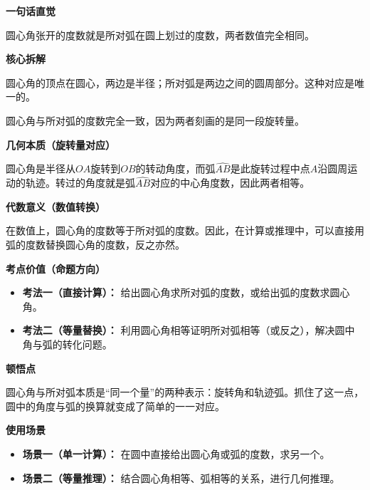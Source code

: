 \begin{explanationbox}
	\textbf{\textcolor{CExplanation}{一句话直觉}}

	圆心角张开的度数就是所对弧在圆上划过的度数，两者数值完全相同。

	\medskip
	\textbf{\textcolor{CExplanation}{核心拆解}}
	\begin{description}[style=nextline, leftmargin=2.8em, labelsep=0.5em, itemsep=0.45em]
		\item[\textbf{要点一（定义对应）：}] 圆心角的顶点在圆心，两边是半径；所对弧是两边之间的圆周部分。这种对应是唯一的。
		\item[\textbf{要点二（度数等同）：}] 圆心角与所对弧的度数完全一致，因为两者刻画的是同一段旋转量。
	\end{description}

	\medskip
	\textbf{\textcolor{CExplanation}{几何本质（旋转量对应）}}

	圆心角是半径从$OA$旋转到$OB$的转动角度，而弧$\widehat{AB}$是此旋转过程中点$A$沿圆周运动的轨迹。转过的角度就是弧$\widehat{AB}$对应的中心角度数，因此两者相等。

	\medskip
	\textbf{\textcolor{CExplanation}{代数意义（数值转换）}}

	在数值上，圆心角的度数等于所对弧的度数。因此，在计算或推理中，可以直接用弧的度数替换圆心角的度数，反之亦然。

	\medskip
	\textbf{\textcolor{CExplanation}{考点价值（命题方向）}}
	\begin{itemize}[leftmargin=*, itemsep=0.5em, topsep=0.4em]
		\item \textbf{考法一（直接计算）：} 给出圆心角求所对弧的度数，或给出弧的度数求圆心角。
		\item \textbf{考法二（等量替换）：} 利用圆心角相等证明所对弧相等（或反之），解决圆中角与弧的转化问题。
	\end{itemize}

	\medskip
	\textbf{\textcolor{CExplanation}{顿悟点}}

	圆心角与所对弧本质是“同一个量”的两种表示：旋转角和轨迹弧。抓住了这一点，圆中的角度与弧的换算就变成了简单的一一对应。

	\medskip
	\textbf{\textcolor{CExplanation}{使用场景}}
	\begin{itemize}[leftmargin=*, itemsep=0.5em, topsep=0.4em]
		\item \textbf{场景一（单一计算）：} 在圆中直接给出圆心角或弧的度数，求另一个。
		\item \textbf{场景二（等量推理）：} 结合圆心角相等、弧相等的关系，进行几何推理。
	\end{itemize}
\end{explanationbox}
